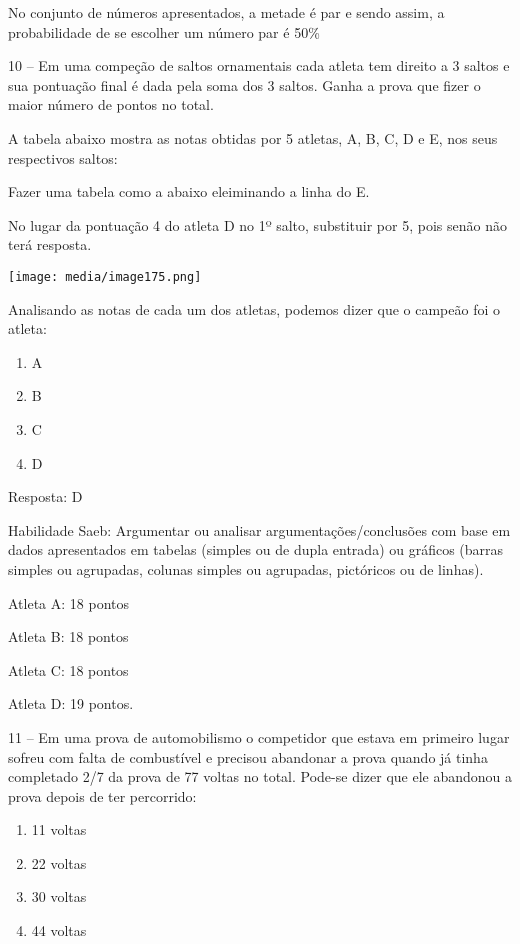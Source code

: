 No conjunto de números apresentados, a metade é par e sendo assim, a
probabilidade de se escolher um número par é 50\%

10 -- Em uma compeção de saltos ornamentais cada atleta tem direito a 3
saltos e sua pontuação final é dada pela soma dos 3 saltos. Ganha a
prova que fizer o maior número de pontos no total.

A tabela abaixo mostra as notas obtidas por 5 atletas, A, B, C, D e E,
nos seus respectivos saltos:

Fazer uma tabela como a abaixo eleiminando a linha do E.

No lugar da pontuação 4 do atleta D no 1º salto, substituir por 5, pois
senão não terá resposta.

\texttt{[image: media/image175.png]}

Analisando as notas de cada um dos atletas, podemos dizer que o campeão
foi o atleta:

\begin{enumerate}
\def\labelenumi{\alph{enumi})}
\item
  A
\item
  B
\item
  C
\item
  D
\end{enumerate}

Resposta: D

Habilidade Saeb: Argumentar ou analisar argumentações/conclusões com
base em dados apresentados em tabelas (simples ou de dupla entrada) ou
gráficos (barras simples ou agrupadas, colunas simples ou agrupadas,
pictóricos ou de linhas).

Atleta A: 18 pontos

Atleta B: 18 pontos

Atleta C: 18 pontos

Atleta D: 19 pontos.

11 -- Em uma prova de automobilismo o competidor que estava em primeiro
lugar sofreu com falta de combustível e precisou abandonar a prova
quando já tinha completado 2/7 da prova de 77 voltas no total. Pode-se
dizer que ele abandonou a prova depois de ter percorrido:

\begin{enumerate}
\def\labelenumi{\alph{enumi})}
\item
  11 voltas
\item
  22 voltas
\item
  30 voltas
\item
  44 voltas
\end{enumerate}

